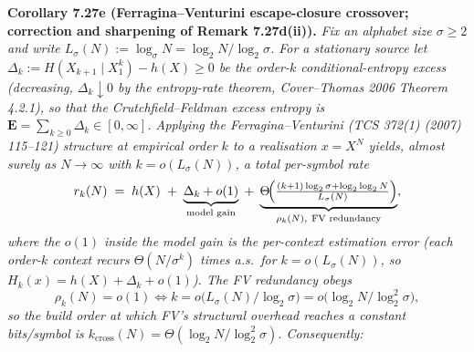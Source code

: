 \documentclass[
]{article}
\begin{document}
\textbf{Corollary 7.27e (Ferragina--Venturini escape-closure crossover;
correction and sharpening of Remark 7.27d(ii)).} \emph{Fix an alphabet
size $\sigma \geq 2$ and write $L_\sigma(N) := \log_\sigma N = \log_2 N /
\log_2 \sigma$. For a stationary source let
$\Delta_k := H(X_{k+1} \mid X_1^k) - h(X) \geq 0$ be the order-$k$
conditional-entropy excess (decreasing, $\Delta_k \downarrow 0$ by the
entropy-rate theorem, Cover--Thomas 2006 Theorem 4.2.1), so that the
Crutchfield--Feldman excess entropy is $\mathbf{E} = \sum_{k \geq 0}
\Delta_k \in [0, \infty]$. Applying the Ferragina--Venturini (TCS 372(1)
(2007) 115--121) structure at empirical order $k$ to a realisation
$x = X^N$ yields, almost surely as $N \to \infty$ with $k = o(L_\sigma
(N))$, a total per-symbol rate}
\[
  r_k(N) \;=\; h(X) \;+\; \underbrace{\Delta_k + o(1)}_{\text{model gain}}
  \;+\; \underbrace{\Theta\!\Bigl(\tfrac{(k+1)\log_2\sigma + \log_2\log_2 N}
  {L_\sigma(N)}\Bigr)}_{\rho_k(N),\ \text{FV redundancy}} ,
\]
\emph{where the $o(1)$ inside the model gain is the per-context
estimation error (each order-$k$ context recurs $\Theta(N/\sigma^k)$
times a.s.\ for $k = o(L_\sigma(N))$, so $H_k(x) = h(X) + \Delta_k +
o(1)$). The FV redundancy obeys}
\[
  \rho_k(N) = o(1) \iff k = o\!\bigl(L_\sigma(N)/\log_2\sigma\bigr)
  = o\!\bigl(\log_2 N / \log_2^2 \sigma\bigr),
\]
\emph{so the build order at which FV's structural overhead reaches a
constant bits/symbol is $k_{\mathrm{cross}}(N) = \Theta(\log_2 N /
\log_2^2\sigma)$. Consequently:}
\end{document}
